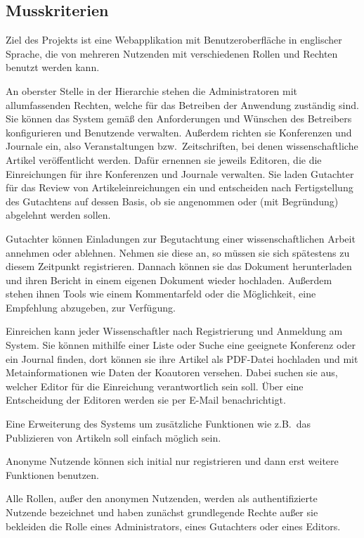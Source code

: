
\subsection{Musskriterien}
Ziel des Projekts ist eine Webapplikation mit Benutzeroberfläche in englischer Sprache, die von mehreren Nutzenden mit verschiedenen Rollen und Rechten benutzt werden kann.

An oberster Stelle in der Hierarchie stehen die Administratoren mit allumfassenden Rechten, welche für das Betreiben der Anwendung zuständig sind.
Sie können das System gemäß den Anforderungen und Wünschen des Betreibers konfigurieren und Benutzende verwalten.
Außerdem richten sie Konferenzen und Journale ein, also Veranstaltungen bzw.\ Zeitschriften, bei denen wissenschaftliche Artikel veröffentlicht werden.
Dafür ernennen sie jeweils Editoren, die die Einreichungen für ihre Konferenzen und Journale verwalten.
Sie laden Gutachter für das Review von Artikeleinreichungen ein und entscheiden nach Fertigstellung des Gutachtens auf dessen Basis, ob sie angenommen oder (mit Begründung) abgelehnt werden sollen.

Gutachter können Einladungen zur Begutachtung einer wissenschaftlichen Arbeit annehmen oder ablehnen.
Nehmen sie diese an, so müssen sie sich spätestens zu diesem Zeitpunkt registrieren.
Dannach können sie das Dokument herunterladen und ihren Bericht in einem eigenen Dokument wieder hochladen.
Außerdem stehen ihnen Tools wie einem Kommentarfeld oder die Möglichkeit, eine Empfehlung abzugeben, zur Verfügung.

Einreichen kann jeder Wissenschaftler nach Registrierung und Anmeldung am System.
Sie können mithilfe einer Liste oder Suche eine geeignete Konferenz oder ein Journal finden,
dort können sie ihre Artikel als PDF-Datei hochladen und mit Metainformationen wie Daten der Koautoren versehen.
Dabei suchen sie aus, welcher Editor für die Einreichung verantwortlich sein soll.
Über eine Entscheidung der Editoren werden sie per E-Mail benachrichtigt.

Eine Erweiterung des Systems um zusätzliche Funktionen wie z.B.\ das Publizieren von Artikeln soll einfach möglich sein.

Anonyme Nutzende können sich initial nur registrieren und dann erst weitere Funktionen benutzen.

Alle Rollen, außer den anonymen Nutzenden, werden als authentifizierte Nutzende bezeichnet und haben zunächst grundlegende Rechte außer sie bekleiden die Rolle eines Administrators, eines Gutachters oder eines Editors.


